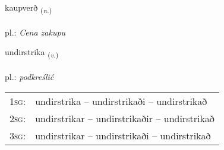 \documentclass[frontgrid, backgrid]{flacards}\usepackage[]{graphicx}\usepackage[]{xcolor}
\begin{document}
\renewcommand{\blhead}{\vskip5pt {\small\bfseries\footnotesize Nafnorð | rzeczownik }}
\renewcommand{\bcfoot}{\vskip5pt \hspace{2pt}{\small\bfseries\footnotesize 3K}}


{kaupverð \small{\textsubscript{(\textit{n.})}} \\[1ex] %
\textphonetic{[kʰœiːpvɛrð]} \\
pl.: \emph{Cena zakupu} \\  [2ex]
\renewcommand*{\arraystretch}{0.8}
}

\renewcommand{\flhead}{\vskip5pt \fboxsep=0pt {\small\bfseries\footnotesize Sagnorð | czasownik}}
\renewcommand{\fcfoot}{\vskip5pt \fboxsep=0pt \hspace{2pt}{\small\bfseries\footnotesize 3K}}

\renewcommand{\blhead}{\vskip5pt {\small\bfseries\footnotesize Sagnorð | czasownik }}
\renewcommand{\bcfoot}{\vskip5pt \hspace{2pt}{\small\bfseries\footnotesize 3K}}


{undirstrika \small{\textsubscript{(\textit{v.})}} \\[1ex] %
 \\
pl.: \emph{podkreślić} \\  [2ex]
\renewcommand*{\arraystretch}{0.8}
\begin{tabular}{p{1cm}l}
\textsc{1sg}: & undirstrika -- undirstrikaði -- undirstrikað \\ 
\textsc{2sg}: & undirstrikar -- undirstrikaðir -- undirstrikað \\ 
\textsc{3sg}: & undirstrikar -- undirstrikaði -- undirstrikað \\ 
\end{tabular}
}
\end{document}
